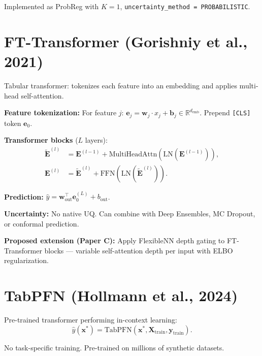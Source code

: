 \documentclass[11pt,a4paper]{article}
\theoremstyle{definition}
\newcommand{\R}{\mathbb{R}}
\newcommand{\bx}{\mathbf{x}}
\newcommand{\by}{\mathbf{y}}
\newcommand{\bw}{\mathbf{w}}
\newcommand{\bX}{\mathbf{X}}
\begin{document}
\begin{implnote}
Implemented as ProbReg with $K = 1$, \texttt{uncertainty\_method = PROBABILISTIC}.
\end{implnote}

\section{FT-Transformer (Gorishniy et al., 2021)}

Tabular transformer: tokenizes each feature into an embedding and applies
multi-head self-attention.

\textbf{Feature tokenization:} For feature $j$:
$\mathbf{e}_j = \bw_j \cdot x_j + \mathbf{b}_j \in \R^{d_{\mathrm{emb}}}$.
Prepend \texttt{[CLS]} token $\mathbf{e}_0$.

\textbf{Transformer blocks} ($L$ layers):
\begin{align}
  \tilde{\mathbf{E}}^{(l)} &= \mathbf{E}^{(l-1)} + \mathrm{MultiHeadAttn}(\mathrm{LN}(\mathbf{E}^{(l-1)})), \\
  \mathbf{E}^{(l)} &= \tilde{\mathbf{E}}^{(l)} + \mathrm{FFN}(\mathrm{LN}(\tilde{\mathbf{E}}^{(l)})).
\end{align}

\textbf{Prediction:} $\hat{y} = \bw_{\mathrm{out}}^\top \mathbf{e}_0^{(L)} + b_{\mathrm{out}}$.

\textbf{Uncertainty:} No native UQ. Can combine with Deep Ensembles,
MC Dropout, or conformal prediction.

\textbf{Proposed extension (Paper C):} Apply FlexibleNN depth gating to
FT-Transformer blocks --- variable self-attention depth per input with
ELBO regularization.

\section{TabPFN (Hollmann et al., 2024)}

Pre-trained transformer performing in-context learning:
\[
  \hat{y}(\bx^*) = \mathrm{TabPFN}(\bx^*, \bX_{\mathrm{train}}, \by_{\mathrm{train}}).
\]

No task-specific training. Pre-trained on millions of synthetic datasets.
\end{document}
